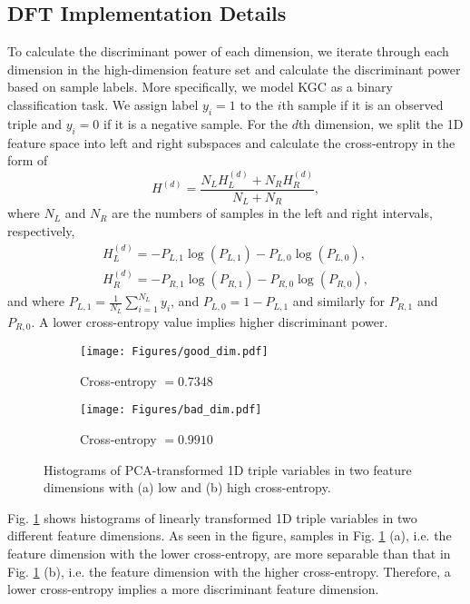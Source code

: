 \documentclass{article}
\begin{document}
\subsection{DFT Implementation Details}\label{appendix:dft}

To calculate the discriminant power of each dimension, we iterate
through each dimension in the high-dimension feature set and calculate
the discriminant power based on sample labels. More specifically,
we model KGC as a binary classification task. We assign label $y_i = 1$
to the $i$th sample if it is an observed triple and $y_i = 0$ if it
is a negative sample. For the $d$th dimension, we split the 1D
feature space into left and right subspaces and calculate the cross-entropy
in the form of
\begin{equation}
        H^{(d)} = \frac{N_LH_L^{(d)} + N_RH_R^{(d)}}{N_L + N_R},
\end{equation}
where $N_L$ and $N_R$ are the numbers of samples in the left and right intervals,
respectively,
\begin{eqnarray}
        H_L^{(d)} = - P_{L, 1}\log(P_{L, 1}) - P_{L, 0}\log(P_{L, 0}), \\
        H_R^{(d)} = - P_{R, 1}\log(P_{R, 1}) - P_{R, 0}\log(P_{R, 0}),
\end{eqnarray}
and where $P_{L, 1} = \frac{1}{N_L} \sum_{i=1}^{N_L} y_i$, and 
$P_{L, 0} = 1 - P_{L, 1}$ and similarly for $P_{R, 1}$ and $P_{R, 0}$. A
lower cross-entropy value implies higher discriminant power. 

\begin{figure}[t]
\centering
     \begin{subfigure}[b]{0.48\textwidth}
         \centering
         \texttt{[image: Figures/good\_dim.pdf]}
         \caption{Cross-entropy $= 0.7348$}
     \end{subfigure}
\begin{subfigure}[b]{0.48\textwidth}
         \centering
         \texttt{[image: Figures/bad\_dim.pdf]}
         \caption{Cross-entropy $= 0.9910$}
     \end{subfigure}
\caption{Histograms of PCA-transformed 1D triple variables in two feature dimensions with (a) low and (b) high cross-entropy.}\label{fig:dim_hist}
\end{figure}



Fig. \ref{fig:dim_hist} shows histograms of linearly transformed 1D triple 
variables in two different feature dimensions. As seen in the figure, samples in
Fig. \ref{fig:dim_hist} (a), i.e. the feature dimension with the lower 
cross-entropy, are more separable than that in Fig. \ref{fig:dim_hist} (b), i.e.
the feature dimension with the higher cross-entropy. Therefore, a lower 
cross-entropy implies a more discriminant feature dimension.
\end{document}

